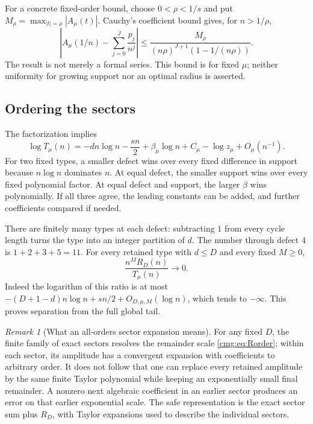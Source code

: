 \documentclass[11pt,letterpaper]{article}
\numberwithin{equation}{section}
\theoremstyle{definition}\newtheorem{definition}[theorem]{Definition}
\theoremstyle{remark}\newtheorem{remark}[theorem]{Remark}
\begin{document}
For a concrete fixed-order bound, choose $0<\rho<1/s$ and put $M_\rho=\max_{|t|=\rho}|A_\mu(t)|$. Cauchy's coefficient bound gives, for $n>1/\rho$,
\begin{equation}\label{cmg:eq:Cauchy}
 \left|A_\mu(1/n)-\sum_{j=0}^J\frac{p_j}{n^j}\right|
 \le \frac{M_\rho}{(n\rho)^{J+1}(1-1/(n\rho))}.
\end{equation}
The result is not merely a formal series. This bound is for fixed $\mu$; neither uniformity for growing support nor an optimal radius is asserted.

\subsection{Ordering the sectors}
The factorization implies
\begin{equation}\label{cmg:eq:logscale}
 \log T_\mu(n)=-dn\log n-\frac{s n}{2}
              +\beta_\mu\log n+C_\mu-\log z_\mu+O_\mu(n^{-1}).
\end{equation}
For two fixed types, a smaller defect wins over every fixed difference in support because $n\log n$ dominates $n$. At equal defect, the smaller support wins over every fixed polynomial factor. At equal defect and support, the larger $\beta$ wins polynomially. If all three agree, the leading constants can be added, and further coefficients compared if needed.

There are finitely many types at each defect: subtracting $1$ from every cycle length turns the type into an integer partition of $d$. The number through defect $4$ is $1+2+3+5=11$. For every retained type with $d\le D$ and every fixed $M\ge0$,
\begin{equation}\label{cmg:eq:tail-flat}
 \frac{n^M R_D(n)}{T_\mu(n)}\longrightarrow0.
\end{equation}
Indeed the logarithm of this ratio is at most $-(D+1-d)n\log n+sn/2+O_{D,\mu,M}(\log n)$, which tends to $-\infty$. This proves separation from the full global tail.

\begin{remark}[What an all-orders sector expansion means]\label{cmg:rem:all-orders}
For any fixed $D$, the finite family of exact sectors resolves the remainder scale \eqref{cmg:eq:Rorder}; within each sector, its amplitude has a convergent expansion with coefficients to arbitrary order. It does not follow that one can replace every retained amplitude by the same finite Taylor polynomial while keeping an exponentially small final remainder. A nonzero next algebraic coefficient in an earlier sector produces an error on that earlier exponential scale. The safe representation is the exact sector sum plus $R_D$, with Taylor expansions used to describe the individual sectors.
\end{remark}
\end{document}
